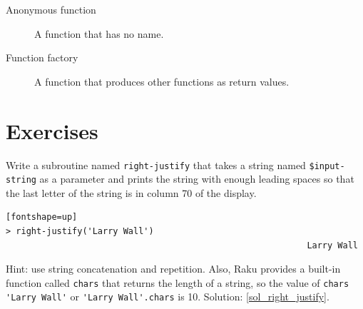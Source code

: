 \begin{description}
\item[Anonymous function] A function that has no name.

\item[Function factory] A function that produces other functions as return values.

\end{description}


\section{Exercises}

\begin{exercise}
\label{right_justify}

Write a subroutine named \verb"right-justify" that takes a string
named {\tt \$input-string} as a parameter and prints the 
string with enough leading spaces so that the last letter 
of the string is in column 70 of the display.

\begin{verbatim}[fontshape=up]
> right-justify('Larry Wall')
                                                           Larry Wall
\end{verbatim}

Hint: use string concatenation and repetition.  Also,
Raku provides a built-in function called {\tt chars} that
returns the length of a string, so the value of 
\verb"chars 'Larry Wall'" or \verb"'Larry Wall'.chars" is 10.
Solution: \ref{sol_right_justify}.

\end{exercise}


